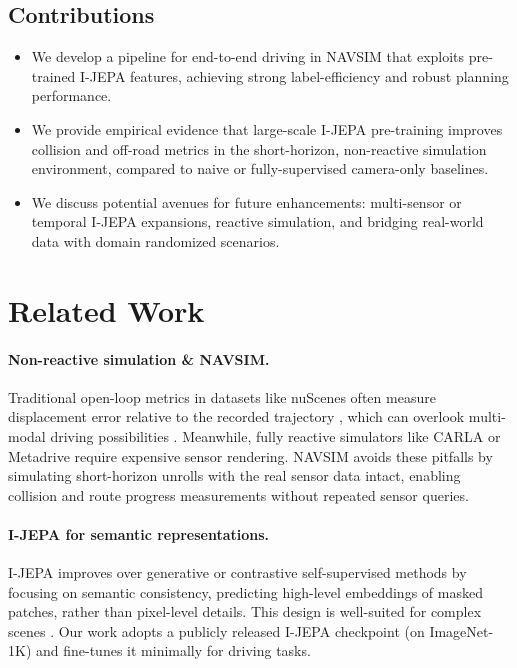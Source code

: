 \documentclass{article}
\begin{document}
\subsection{Contributions}
\begin{itemize}
    \item We develop a pipeline for end-to-end driving in NAVSIM \cite{dauner2024navsim} that exploits pre-trained I-JEPA \cite{assran2023ijepa} features, achieving strong label-efficiency and robust planning performance.
    \item We provide empirical evidence that large-scale I-JEPA pre-training improves collision and off-road metrics in the short-horizon, non-reactive simulation environment, compared to naive or fully-supervised camera-only baselines.
    \item We discuss potential avenues for future enhancements: multi-sensor or temporal I-JEPA expansions, reactive simulation, and bridging real-world data with domain randomized scenarios.
\end{itemize}

\section{Related Work}
\paragraph{Non-reactive simulation \& NAVSIM.}
Traditional open-loop metrics in datasets like nuScenes often measure displacement error relative to the recorded trajectory \cite{nuscenes}, which can overlook multi-modal driving possibilities \cite{zhairet2023rethinking}. Meanwhile, fully reactive simulators like CARLA \cite{carla} or Metadrive \cite{li2021metadrive} require expensive sensor rendering. NAVSIM \cite{dauner2024navsim} avoids these pitfalls by simulating short-horizon unrolls with the real sensor data intact, enabling collision and route progress measurements without repeated sensor queries. 

\paragraph{I-JEPA for semantic representations.}
I-JEPA \cite{assran2023ijepa} improves over generative or contrastive self-supervised methods by focusing on semantic consistency, predicting high-level embeddings of masked patches, rather than pixel-level details. This design is well-suited for complex scenes \cite{assran2023ijepa}. Our work adopts a publicly released I-JEPA checkpoint (on ImageNet-1K) and fine-tunes it minimally for driving tasks. 
\end{document}
